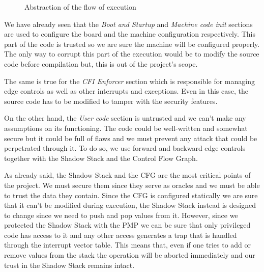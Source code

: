 \begin{figure}[htbp]
  \centering
  \def\stackalignment{r} %
  {\scriptsize }
  \caption{Abstraction of the flow of execution}
  \label{fig:functioning}
\end{figure}

We have already seen that the \textit{Boot and Startup} and \textit{Machine code
init} sections are used to configure the board and the machine configuration respectively.
This part of the code is trusted so we are sure the machine will be configured
properly. The only way to corrupt this part of the execution would be to modify the
source code before compilation but, this is out of the project's scope.

The same is true for the \textit{CFI Enforcer} section which is responsible for managing
edge controls as well as other interrupts and exceptions. Even in this case, the
source code has to be modified to tamper with the security features.

On the other hand, the \textit{User code} section is untrusted and we can't make
any assumptions on its functioning. The code could be well-written and somewhat
secure but it could be full of flaws and we must prevent any attack that could
be perpetrated through it. To do so, we use forward and backward edge controls
together with the Shadow Stack and the Control Flow Graph.

As already said, the Shadow Stack and the CFG are the most critical points of the
project. We must secure them since they serve as oracles and we must be able to
trust the data they contain. Since the CFG is configured statically we are sure that
it can't be modified during execution, the Shadow Stack instead is designed to
change since we need to push and pop values from it. However, since we protected
the Shadow Stack with the PMP we can be sure that only privileged code has
access to it and any other access generates a trap that is handled through the
interrupt vector table. This means that, even if one tries to add or remove
values from the stack the operation will be aborted immediately and our trust in
the Shadow Stack remains intact.

